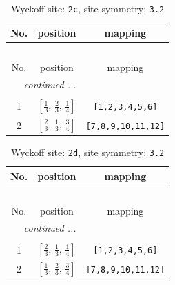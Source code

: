 \documentclass[fleqn,8pt]{jsarticle}
\begin{document}
\renewcommand{\arraystretch}{1.2}
\begin{longtable}{ccc}
\caption{Wyckoff site: {\tt 2c}, site symmetry: {\tt 3.2}}
 \\
 \hline \hline
No. & position & mapping \\ \hline \endfirsthead

\multicolumn{2}{l}{\tablename\ \thetable{}} \\
 \hline \hline
No. & position & mapping \\ \hline \endhead

 \hline \hline
\multicolumn{2}{r}{\footnotesize\it continued ...} \\ \endfoot

 \hline \hline
\multicolumn{2}{r}{} \\ \endlastfoot

1 & $\left[ \frac{1}{3},\, \frac{2}{3},\, \frac{1}{4} \right]$ & {\tt [1,2,3,4,5,6]} \\ \hline
2 & $\left[ \frac{2}{3},\, \frac{1}{3},\, \frac{3}{4} \right]$ & {\tt [7,8,9,10,11,12]} \\
\end{longtable}
\renewcommand{\arraystretch}{1.2}
\begin{longtable}{ccc}
\caption{Wyckoff site: {\tt 2d}, site symmetry: {\tt 3.2}}
 \\
 \hline \hline
No. & position & mapping \\ \hline \endfirsthead

\multicolumn{2}{l}{\tablename\ \thetable{}} \\
 \hline \hline
No. & position & mapping \\ \hline \endhead

 \hline \hline
\multicolumn{2}{r}{\footnotesize\it continued ...} \\ \endfoot

 \hline \hline
\multicolumn{2}{r}{} \\ \endlastfoot

1 & $\left[ \frac{2}{3},\, \frac{1}{3},\, \frac{1}{4} \right]$ & {\tt [1,2,3,4,5,6]} \\ \hline
2 & $\left[ \frac{1}{3},\, \frac{2}{3},\, \frac{3}{4} \right]$ & {\tt [7,8,9,10,11,12]} \\
\end{longtable}
\renewcommand{\arraystretch}{1.2}
\end{document}
